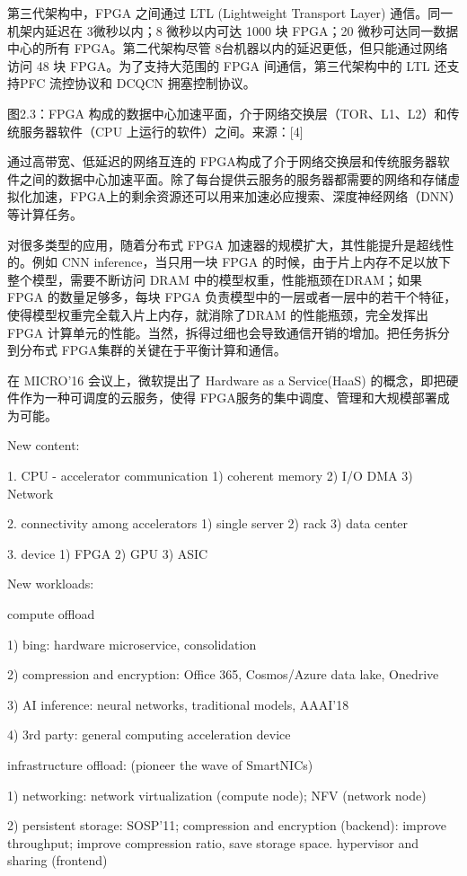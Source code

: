 第三代架构中，FPGA 之间通过 LTL (Lightweight Transport Layer) 通信。同一机架内延迟在 3微秒以内；8 微秒以内可达 1000 块 FPGA；20 微秒可达同一数据中心的所有 FPGA。第二代架构尽管 8台机器以内的延迟更低，但只能通过网络访问 48 块 FPGA。为了支持大范围的 FPGA 间通信，第三代架构中的 LTL 还支持PFC 流控协议和 DCQCN 拥塞控制协议。

图2.3：FPGA 构成的数据中心加速平面，介于网络交换层（TOR、L1、L2）和传统服务器软件（CPU 上运行的软件）之间。来源：[4]

通过高带宽、低延迟的网络互连的 FPGA构成了介于网络交换层和传统服务器软件之间的数据中心加速平面。除了每台提供云服务的服务器都需要的网络和存储虚拟化加速，FPGA上的剩余资源还可以用来加速必应搜索、深度神经网络（DNN）等计算任务。

对很多类型的应用，随着分布式 FPGA 加速器的规模扩大，其性能提升是超线性的。例如 CNN inference，当只用一块 FPGA 的时候，由于片上内存不足以放下整个模型，需要不断访问 DRAM 中的模型权重，性能瓶颈在DRAM；如果 FPGA 的数量足够多，每块 FPGA 负责模型中的一层或者一层中的若干个特征，使得模型权重完全载入片上内存，就消除了DRAM 的性能瓶颈，完全发挥出 FPGA 计算单元的性能。当然，拆得过细也会导致通信开销的增加。把任务拆分到分布式 FPGA集群的关键在于平衡计算和通信。

在 MICRO’16 会议上，微软提出了 Hardware as a Service(HaaS) 的概念，即把硬件作为一种可调度的云服务，使得 FPGA服务的集中调度、管理和大规模部署成为可能。

New content:

1. CPU - accelerator communication
1) coherent memory
2) I/O DMA
3) Network

2. connectivity among accelerators
1) single server
2) rack
3) data center

3. device
1) FPGA
2) GPU
3) ASIC

New workloads:

compute offload

1) bing: hardware microservice, consolidation

2) compression and encryption: Office 365, Cosmos/Azure data lake, Onedrive

3) AI inference: neural networks, traditional models, AAAI'18

4) 3rd party: general computing acceleration device

infrastructure offload: (pioneer the wave of SmartNICs)

1) networking: network virtualization (compute node); NFV (network node)

2) persistent storage: SOSP'11; compression and encryption (backend): improve throughput; improve compression ratio, save storage space.
hypervisor and sharing (frontend)


